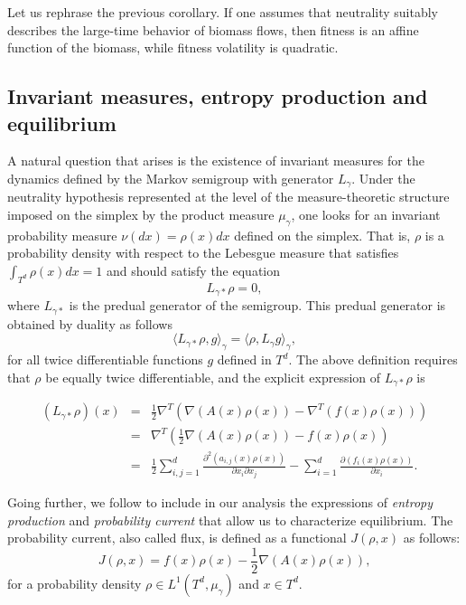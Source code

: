 \documentclass[12pt]{article}
\begin{document}
\begin{rem}
    Let us rephrase the previous corollary. If one assumes that neutrality suitably describes the large-time behavior of biomass flows, then fitness is an affine function of the biomass, while fitness volatility  is quadratic.
\end{rem}
\subsection{Invariant measures, entropy production and equilibrium}
A natural question that arises is the existence of invariant measures for the dynamics defined by the Markov semigroup with generator $L_\gamma$. Under the neutrality hypothesis represented at the level of the measure-theoretic structure imposed on the simplex by the product measure $\mu_\gamma$, one looks for an invariant probability measure $\nu (dx)=\rho (x)dx$ defined on the simplex. That is, $\rho$ is a probability density with respect to the Lebesgue measure that satisfies $\int_{T^d} \rho(x)dx=1$ and should satisfy the equation
\begin{equation}
    L_{\gamma *}\rho=0,
\end{equation}
where $L_{\gamma *}$ is the predual generator of the semigroup. This predual generator is obtained by duality as follows
\begin{equation}
    \langle L_{\gamma *}\rho,g\rangle_\gamma=\langle \rho,L_\gamma g\rangle_\gamma,
\end{equation}
for all twice differentiable functions $g$ defined in $T^d$. The above definition requires that $\rho$ be equally twice differentiable, and the explicit expression of $L_{\gamma *}\rho$ is

\begin{eqnarray}
       ( L_{\gamma *}\rho)(x)&=&\frac{1}{2}\nabla^T\left(\nabla (A(x)\rho(x))-\nabla^T(f(x)\rho(x))\right)\nonumber\\
        &=&\nabla^T\left(\frac{1}{2}\nabla (A(x)\rho(x))-f(x)\rho(x)\right)\\
        &=&\frac{1}{2}\sum_{i,j=1}^{d}\frac{\partial^2(a_{i,j}(x)\rho(x))}{\partial x_i\partial x_j}-\sum_{i=1}^{d}\frac{\partial(f_i(x)\rho(x))}{\partial x_i}.\nonumber
    \end{eqnarray}

Going further, we follow \cite{Jiang.2004} to include in our analysis the expressions of \textit{entropy production} and \textit{probability current} that allow us to characterize equilibrium. The probability current, also called flux, is defined as a functional $J(\rho,x)$ as follows:
\begin{equation}\label{current}
J(\rho,x)= f(x)\rho(x)-\frac{1}{2}\nabla (A(x)\rho(x)),   
\end{equation}
for a probability density $\rho\in L^1(T^d,\mu_\gamma)$ and $x\in T^d$. 
\end{document}
